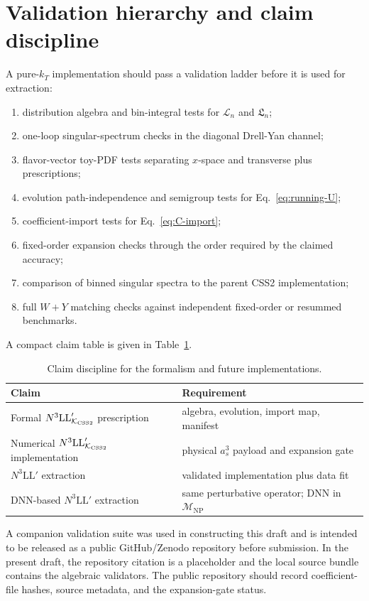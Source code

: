 \documentclass[aps,prd,preprint,superscriptaddress,nofootinbib,longbibliography]{revtex4-2}
\newcommand{\KCSS}{\mathcal K_{\rm CSS2}}
\newcommand{\NP}{\mathrm{NP}}
\newcommand{\NthreeLLp}{N^3\mathrm{LL}'}
\begin{document}
\section{Validation hierarchy and claim discipline}

A pure-$k_T$ implementation should pass a validation ladder before it is used for extraction:
\begin{enumerate}
  \item distribution algebra and bin-integral tests for $\mathcal L_n$ and $\mathfrak L_n$;
  \item one-loop singular-spectrum checks in the diagonal Drell-Yan channel;
  \item flavor-vector toy-PDF tests separating $x$-space and transverse plus prescriptions;
  \item evolution path-independence and semigroup tests for Eq.~\eqref{eq:running-U};
  \item coefficient-import tests for Eq.~\eqref{eq:C-import};
  \item fixed-order expansion checks through the order required by the claimed accuracy;
  \item comparison of binned singular spectra to the parent CSS2 implementation;
  \item full $W+Y$ matching checks against independent fixed-order or resummed benchmarks.
\end{enumerate}
A compact claim table is given in Table~\ref{tab:claims}.

\begin{table}[t]
\caption{Claim discipline for the formalism and future implementations.}
\label{tab:claims}
\begin{ruledtabular}
\begin{tabular}{ll}
Claim & Requirement \\
\hline
Formal $\NthreeLLp_{\KCSS}$ prescription & algebra, evolution, import map, manifest \\
Numerical $\NthreeLLp_{\KCSS}$ implementation & physical $a_s^3$ payload and expansion gate \\
$\NthreeLLp$ extraction & validated implementation plus data fit \\
DNN-based $\NthreeLLp$ extraction & same perturbative operator; DNN in $\mathcal M_{\NP}$ \\
\end{tabular}
\end{ruledtabular}
\end{table}

A companion validation suite was used in constructing this draft and is intended to be released as a public GitHub/Zenodo repository before submission.  In the present draft, the repository citation is a placeholder and the local source bundle contains the algebraic validators.  The public repository should record coefficient-file hashes, source metadata, and the expansion-gate status.
\end{document}
